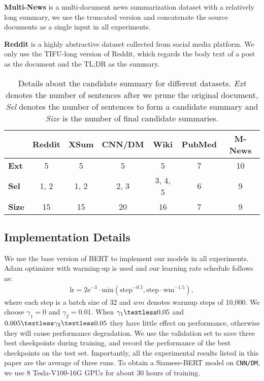 \textbf{Multi-News} \cite{DBLP:conf/acl/FabbriLSLR19} is a multi-document news summarization dataset with a relatively long summary, we use the truncated version and concatenate the source documents as a single input in all experiments.

\textbf{Reddit} \cite{kim2019abstractive} is a highly abstractive dataset collected from social media platform. We only use the TIFU-long version of Reddit, which regards the body text of a post as the document and the TL;DR as the summary.

\renewcommand\arraystretch{1.3}
\begin{table}[t]\footnotesize\setlength{\tabcolsep}{2.3pt}
  \centering
    \begin{tabular}{lcccccc}
    \toprule
      & \textbf{Reddit} & \textbf{XSum} & \textbf{CNN/DM} & \textbf{Wiki} & \textbf{PubMed} & \textbf{M-News} \\
    \midrule
    \textbf{Ext} & 5 & 5 & 5 & 5 & 7 & 10 \\
    \textbf{Sel} & 1, 2 & 1, 2 & 2, 3 & 3, 4, 5 & 6 & 9 \\
    \textbf{Size} & 15 & 15 & 20 & 16 & 7 & 9 \\
    \bottomrule
    \end{tabular}%
  \caption{Details about the candidate summary for different datasets. \textit{Ext} denotes the number of sentences after we prune the original document, \textit{Sel} denotes the number of sentences to form a candidate summary and \textit{Size} is the number of final candidate summaries.}
  \label{tab:candidate size}
\end{table}%

\subsection{Implementation Details}
We use the base version of BERT to implement our models in all experiments. Adam optimizer \cite{kingma2014adam} with warming-up is used and our learning rate schedule follows \citet{vaswani2017attention} as:
\begin{align}
    \mathrm{lr} = \mathrm{2e^{-3} \cdot min(step^{-0.5}, step \cdot wm^{-1.5})},
\end{align}
where each step is a batch size of 32 and $wm$ denotes warmup steps of 10,000. We choose $\gamma_1=0$ and $\gamma_2=0.01$. When $\gamma_1 \textless 0.05$ and $0.005 \textless \gamma_2 \textless 0.05$ they have little effect on performance, otherwise they will cause performance degradation. We use the validation set to save three best checkpoints during training, and record the performance of the best checkpoints on the test set. Importantly, all the experimental results listed in this paper are the average of three runs. To obtain a Siamese-BERT model on \texttt{CNN/DM}, we use 8 Tesla-V100-16G GPUs for about 30 hours of training.

